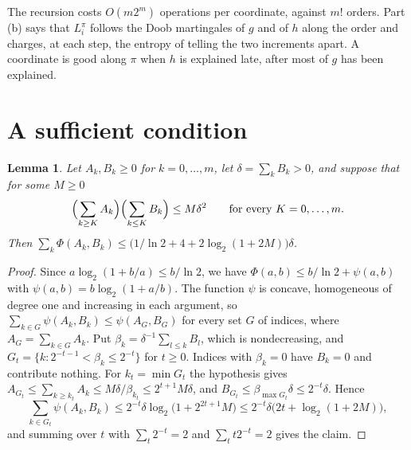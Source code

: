 \documentclass[11pt]{amsart}
\newtheorem{lemma}[theorem]{Lemma}
\theoremstyle{remark}
\begin{document}
The recursion costs $O(m2^m)$ operations per coordinate, against $m!$ orders. Part (b) says that $L^\pi_i$ follows the
Doob martingales of $g$ and of $h$ along the order and charges, at each step, the entropy of telling the two increments
apart. A coordinate is good along $\pi$ when $h$ is explained late, after most of $g$ has been explained.

\section{A sufficient condition}\label{sec:suff}

\begin{lemma}\label{lem:two}
Let $A_k,B_k\ge0$ for $k=0,\dots,m$, let $\delta=\sum_kB_k>0$, and suppose that for some $M\ge0$
\[
\Bigl(\sum_{k\ge K}A_k\Bigr)\Bigl(\sum_{k\le K}B_k\Bigr)\le M\delta^2\qquad\text{for every }K=0,\dots,m.
\]
Then $\sum_k\Phi(A_k,B_k)\le\bigl(1/\ln2+4+2\log_2(1+2M)\bigr)\delta$.
\end{lemma}

\begin{proof}
Since $a\log_2(1+b/a)\le b/\ln 2$, we have $\Phi(a,b)\le b/\ln2+\psi(a,b)$ with $\psi(a,b)=b\log_2(1+a/b)$. The function
$\psi$ is concave, homogeneous of degree one and increasing in each argument, so $\sum_{k\in G}\psi(A_k,B_k)\le
\psi(A_G,B_G)$ for every set $G$ of indices, where $A_G=\sum_{k\in G}A_k$. Put $\beta_k=\delta^{-1}\sum_{l\le k}B_l$,
which is nondecreasing, and $G_t=\{k:2^{-t-1}<\beta_k\le2^{-t}\}$ for $t\ge0$. Indices with $\beta_k=0$ have $B_k=0$ and
contribute nothing. For $k_t=\min G_t$ the hypothesis gives $A_{G_t}\le\sum_{k\ge k_t}A_k\le M\delta/\beta_{k_t}\le
2^{t+1}M\delta$, and $B_{G_t}\le\beta_{\max G_t}\delta\le2^{-t}\delta$. Hence
\[
\sum_{k\in G_t}\psi(A_k,B_k)\le2^{-t}\delta\log_2\bigl(1+2^{2t+1}M\bigr)\le2^{-t}\delta\bigl(2t+\log_2(1+2M)\bigr),
\]
and summing over $t$ with $\sum_t2^{-t}=2$ and $\sum_tt2^{-t}=2$ gives the claim.
\end{proof}
\end{document}
